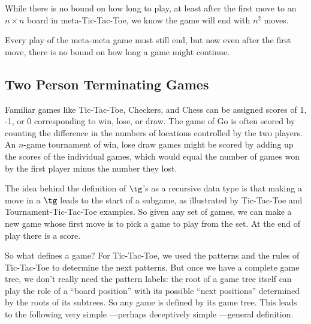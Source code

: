 \begin{definition}
\begin{staffnotes}

While there is no bound on how long to play, at least after the
first move to an $n \times n$ board in meta-Tic-Tac-Toe, we know the game
will end with $n^2$ moves.

\end{staffnotes}

\iffalse
Now that we recognize $T^4$ as a \tg, we can go on to
a \emph{meta}-$T^4$ game, where the first player chooses a number,
$m>0$, of $T^4$ games to play, and then the second player gets the
first move in each of the individual $T^4$ games to be played.

Then, of course, there's meta-meta-$T^4$\dots.
\fi

\begin{staffnotes}
Every play of the meta-meta game must still end, but now even
after the first move, there is no bound on how long a game might
continue.
\end{staffnotes}

\subsection{Two Person Terminating Games}

Familiar games like Tic-Tac-Toe, Checkers, and Chess can be assigned
scores of 1, -1, or 0 corresponding to win, lose, or draw.  The game of Go
is often scored by counting the difference in the numbers of locations
controlled by the two players.  An $n$-game tournament of win, lose draw
games might be scored by adding up the scores of the individual games,
which would equal the number of games won by the first player minus the
number they lost.  \iffalse A negative score would mean the second player
won more games.\fi

The idea behind the definition of $\tg$'s as a recursive data type is that
making a move in a $\tg$ leads to the start of a subgame, as illustrated
by Tic-Tac-Toe and Tournament-Tic-Tac-Toe examples.  So given any set of
games, we can make a new game whose first move is to pick a game to play
from the set.  At the end of play there is a score.

So what defines a game?  For Tic-Tac-Toe, we used the patterns and the
rules of Tic-Tac-Toe to determine the next patterns.  But once we have
a complete game tree, we don't really need the pattern labels: the
root of a game tree itself can play the role of a ``board position''
with its possible ``next positions'' determined by the roots of its
subtrees.  So any game is defined by its game tree.  This leads to the
following very simple ---perhaps deceptively simple ---general
definition.


\end{definition}
